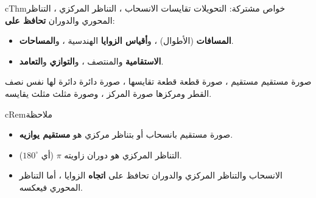 \documentclass[12pt,a4paper]{article}
\newenvironment{BOX}[2]{\begin{otherlanguage}{english}\begin{arbox}{#1}{#2}}{\end{arbox}\end{otherlanguage}}
\newenvironment{khassia}[1][خاصية]{\begin{BOX}{cThm}{#1}}{\end{BOX}}
\newenvironment{molahada}[1][ملاحظة]{\begin{BOX}{cRem}{#1}}{\end{BOX}}
\begin{document}
\begin{khassia}[خواص مشتركة: التحويلات تقايسات]
الانسحاب ، التناظر المركزي ، التناظر المحوري والدوران \textbf{تحافظ على}:
\begin{itemize}
\item \textbf{المسافات} (الأطوال) ، و\textbf{أقياس الزوايا} الهندسية ، و\textbf{المساحات}.
\item \textbf{الاستقامية} والمنتصف ، و\textbf{التوازي} و\textbf{التعامد}.
\end{itemize}
صورة مستقيم مستقيم ، صورة قطعة قطعة تقايسها ، صورة دائرة دائرة لها نفس نصف القطر ومركزها صورة المركز ، وصورة مثلث مثلث يقايسه.
\end{khassia}
\begin{molahada}
\begin{itemize}
\item صورة مستقيم بانسحاب أو بتناظر مركزي هو \textbf{مستقيم يوازيه}.
\item التناظر المركزي هو دوران زاويته $\pi$ (أي $180^\circ$).
\item الانسحاب والتناظر المركزي والدوران تحافظ على \textbf{اتجاه} الزوايا ، أما التناظر المحوري فيعكسه.
\end{itemize}
\end{molahada}

\end{document}
